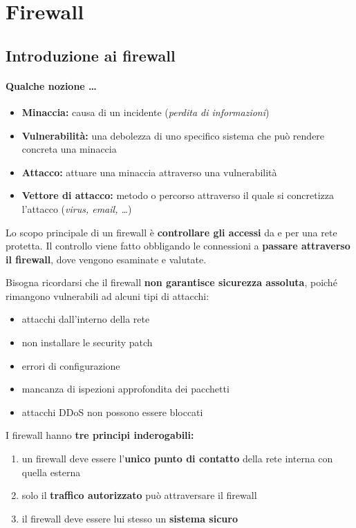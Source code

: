 \chapter{Firewall}

\section{Introduzione ai firewall}

\subsubsection{Qualche nozione \dots}
\begin{itemize}
    \item \textbf{Minaccia:} causa di un incidente (\textit{perdita di 
    informazioni})
    \item \textbf{Vulnerabilità:} una debolezza di uno specifico sistema che può 
    rendere concreta una minaccia 
    \item \textbf{Attacco:} attuare una minaccia attraverso una vulnerabilità 
    \item \textbf{Vettore di attacco:} metodo o percorso attraverso il quale si concretizza 
    l'attacco (\textit{virus, email, \dots})
\end{itemize}

\noindent Lo scopo principale di un firewall è \textbf{controllare gli accessi}
da e per una rete protetta. Il controllo viene fatto obbligando le connessioni
a \textbf{passare attraverso il firewall}, dove vengono esaminate e valutate.

\noindent Bisogna ricordarsi che il firewall \textbf{non garantisce sicurezza 
assoluta}, poiché rimangono vulnerabili ad alcuni tipi di attacchi:
\begin{itemize}
    \item attacchi dall'interno della rete 
    \item non installare le security patch 
    \item errori di configurazione 
    \item mancanza di ispezioni approfondita dei pacchetti 
    \item attacchi DDoS non possono essere bloccati
\end{itemize}

\noindent I firewall hanno \textbf{tre principi inderogabili:}
\begin{enumerate}
    \item un firewall deve essere l'\textbf{unico punto di contatto} della rete interna con quella esterna 
    \item solo il \textbf{traffico autorizzato} può attraversare il firewall
    \item il firewall deve essere lui stesso un \textbf{sistema sicuro}
\end{enumerate}

